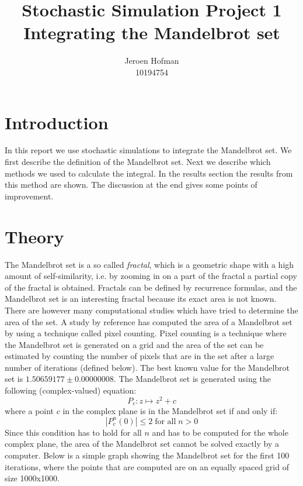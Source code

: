 \documentclass[10pt,a4paper]{article}
\begin{document}
\captionsetup{width=0.8\textwidth}

\author{Jeroen Hofman\\
  		10194754\\
		}
\title{Stochastic Simulation Project 1\\
       Integrating the Mandelbrot set
		}
\maketitle

\newpage

\section{Introduction}
In this report we use stochastic simulations to integrate the Mandelbrot set. We first describe the definition of the Mandelbrot set. Next we describe which methods we used to calculate the integral. In the results section the results from this method are shown. The discussion at the end gives some points of improvement. 

\section{Theory}
\noindent The Mandelbrot set is a so called \emph{fractal}, which is a geometric shape with a high amount of self-similarity, i.e. by zooming in on a part of the fractal a partial copy of the fractal is obtained. Fractals can be defined by recurrence formulas, and the Mandelbrot set is an interesting fractal because its exact area is not known. There are however many computational studies which have tried to determine the area of the set. A study by reference \cite{paper1} has computed the area of a Mandelbrot set by using a technique called pixel counting. Pixel counting is a technique where the Mandelbrot set is generated on a grid and the area of the set can be estimated by counting the number of pixels that are in the set after a large number of iterations (defined below). The best known value for the Mandelbrot set is $1.506 591 77 \pm 0.000 000 08$.
\newline
\newline
\noindent The Mandelbrot set is generated using the following (complex-valued) equation:\\
\begin{equation}
P_{c}: z \mapsto z^{2} + c  
\end{equation}
\noindent where a point $c$ in the complex plane is in the Mandelbrot set if and only if:\\
\begin{equation}
\label{eq:eq1}
|P^{n}_{c}(0)| \leq 2 \; \text{for all} \; n > 0
\end{equation}
\noindent Since this condition has to hold for all $n$ and has to be computed for the whole complex plane, the area of the Mandelbrot set cannot be solved exactly by a computer. Below is a simple graph showing the Mandelbrot set for the first 100 iterations, where the points that are computed are on an equally spaced grid of size 1000x1000.
\end{document}
